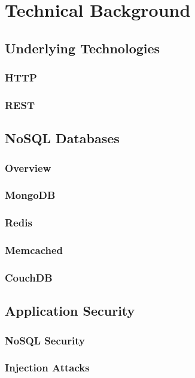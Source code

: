 \chapter{Technical Background}
\label{cha:technicalBackground}

\section{Underlying Technologies}
\subsection{HTTP}
\subsection{REST}

\section{NoSQL Databases}
\subsection{Overview}
\subsection{MongoDB}
\subsection{Redis}
\subsection{Memcached}
\subsection{CouchDB}

\section{Application Security}
\subsection{NoSQL Security}
\subsection{Injection Attacks}